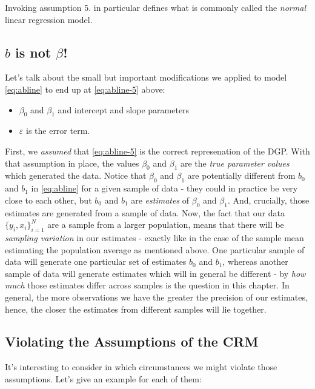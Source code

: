 \documentclass[]{book}
\providecommand{\tightlist}{%
  \setlength{\itemsep}{0pt}\setlength{\parskip}{0pt}}
\begin{document}
Invoking assumption 5. in particular defines what is commonly called the
\emph{normal} linear regression model.

\subsection{\texorpdfstring{\(b\) is not
\(\beta\)!}{b is not \textbackslash{}beta!}}\label{b-is-not-beta}

Let's talk about the small but important modifications we applied to
model \eqref{eq:abline} to end up at \eqref{eq:abline-5} above:

\begin{itemize}
\tightlist
\item
  \(\beta_0\) and \(\beta_1\) and intercept and slope parameters
\item
  \(\varepsilon\) is the error term.
\end{itemize}

First, we \emph{assumed} that \eqref{eq:abline-5} is the correct
represenation of the DGP. With that assumption in place, the values
\(\beta_0\) and \(\beta_1\) are the \emph{true parameter values} which
generated the data. Notice that \(\beta_0\) and \(\beta_1\) are
potentially different from \(b_0\) and \(b_1\) in \eqref{eq:abline} for a
given sample of data - they could in practice be very close to each
other, but \(b_0\) and \(b_1\) are \emph{estimates} of \(\beta_0\) and
\(\beta_1\). And, crucially, those estimates are generated from a sample
of data. Now, the fact that our data \(\{y_i,x_i\}_{i=1}^N\) are a
sample from a larger population, means that there will be \emph{sampling
variation} in our estimates - exactly like in the case of the sample
mean estimating the population average as mentioned above. One
particular sample of data will generate one particular set of estimates
\(b_0\) and \(b_1\), whereas another sample of data will generate
estimates which will in general be different - by \emph{how much} those
estimates differ across samples is the question in this chapter. In
general, the more observations we have the greater the precision of our
estimates, hence, the closer the estimates from different samples will
lie together.

\subsection{Violating the Assumptions of the
CRM}\label{violating-the-assumptions-of-the-crm}

It's interesting to consider in which circumstances we might violate
those assumptions. Let's give an example for each of them:
\end{document}
